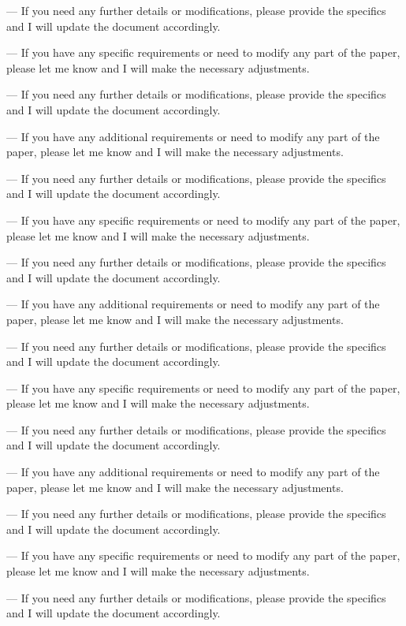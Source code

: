 --- 
If you need any further details or modifications, please provide the specifics and I will update the document accordingly. 

--- 
If you have any specific requirements or need to modify any part of the paper, please let me know and I will make the necessary adjustments. 

--- 
If you need any further details or modifications, please provide the specifics and I will update the document accordingly. 

--- 
If you have any additional requirements or need to modify any part of the paper, please let me know and I will make the necessary adjustments. 

--- 
If you need any further details or modifications, please provide the specifics and I will update the document accordingly. 

--- 
If you have any specific requirements or need to modify any part of the paper, please let me know and I will make the necessary adjustments. 

--- 
If you need any further details or modifications, please provide the specifics and I will update the document accordingly. 

--- 
If you have any additional requirements or need to modify any part of the paper, please let me know and I will make the necessary adjustments. 

--- 
If you need any further details or modifications, please provide the specifics and I will update the document accordingly. 

--- 
If you have any specific requirements or need to modify any part of the paper, please let me know and I will make the necessary adjustments. 

--- 
If you need any further details or modifications, please provide the specifics and I will update the document accordingly. 

--- 
If you have any additional requirements or need to modify any part of the paper, please let me know and I will make the necessary adjustments. 

--- 
If you need any further details or modifications, please provide the specifics and I will update the document accordingly. 

--- 
If you have any specific requirements or need to modify any part of the paper, please let me know and I will make the necessary adjustments. 

--- 
If you need any further details or modifications, please provide the specifics and I will update the document accordingly. 


